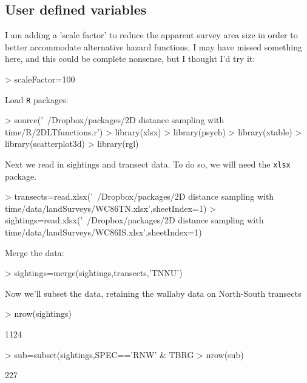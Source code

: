 \documentclass{article}
\begin{document}
\subsection{User defined variables}
\begin{Schunk}
\end{Schunk}
I am adding a 'scale factor' to reduce the apparent survey area size in order to better accommodate alternative hazard functions.  I may have missed something here, and this could be complete nonsense, but I thought I'd try it:
\begin{Schunk}
\begin{Sinput}
> scaleFactor=100
\end{Sinput}
\end{Schunk}
Load \texttt{R} packages:
\begin{Schunk}
\begin{Sinput}
> source('~/Dropbox/packages/2D distance sampling with time/R/2DLTfunctions.r')
> library(xlsx)
> library(psych)
> library(xtable)
> library(scatterplot3d)
> library(rgl)
\end{Sinput}
\end{Schunk}
Next we read in sightings and transect data.  To do so, we will need the \texttt{xlsx} package.
\begin{Schunk}
\begin{Sinput}
> transects=read.xlsx('~/Dropbox/packages/2D distance sampling with time/data/landSurveys/WC86TN.xlsx',sheetIndex=1)
> sightings=read.xlsx('~/Dropbox/packages/2D distance sampling with time/data/landSurveys/WC86IS.xlsx',sheetIndex=1)  
\end{Sinput}
\end{Schunk}
Merge the data:
\begin{Schunk}
\begin{Sinput}
> sightings=merge(sightings,transects,'TNNU')
\end{Sinput}
\end{Schunk}
Now we'll subset the data, retaining the wallaby data on North-South transects
\begin{Schunk}
\begin{Sinput}
> nrow(sightings)
\end{Sinput}
\begin{Soutput}
[1] 1124
\end{Soutput}
\begin{Sinput}
> sub=subset(sightings,SPEC=='RNW' & TBRG %
> nrow(sub)
\end{Sinput}
\begin{Soutput}
[1] 227
\end{Soutput}
\end{Schunk}
\end{document}
